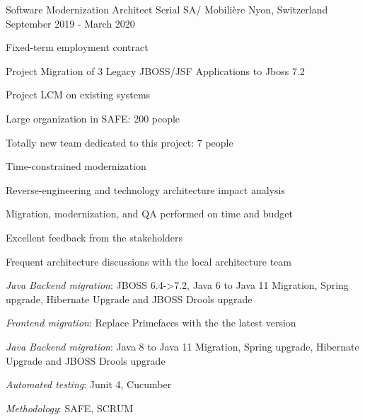 \begin{cventries}
    \cventry
    {Software Modernization Architect} %
    {Serial SA/ Mobilière} %
    {Nyon, Switzerland} %
    {September 2019 - March 2020} %
    {
        \experience
        {
            \begin{cvitems} %
                \item{Fixed-term employment contract}
                \item{Project Migration of 3 Legacy JBOSS/JSF Applications to Jboss 7.2}
                \item{Project LCM on existing systems}
                \item{Large organization in SAFE: 200 people}
                \item{Totally new team dedicated to this project: 7 people}
                \item{Time-constrained modernization}
                \item{Reverse-engineering and technology architecture impact analysis}
            \end{cvitems}
        }
        {
            \begin{cvitems} %
                \item{Migration, modernization, and QA performed on time and budget}
                \item{Excellent feedback from the stakeholders}
                \item{Frequent architecture discussions with the local architecture team}
            \end{cvitems}
        }
        {
            \begin{cvitems} %
                \item{\emph{Java Backend migration}: JBOSS 6.4->7.2, Java 6 to Java 11 Migration, Spring upgrade, Hibernate Upgrade and JBOSS Drools upgrade}
                \item{\emph{Frontend migration}: Replace Primefaces with the the latest version}
                \item{\emph{Java Backend migration}: Java 8 to Java 11 Migration, Spring upgrade, Hibernate Upgrade and JBOSS Drools upgrade}
                \item{\emph{Automated testing}: Junit 4, Cucumber}
                \item{\emph{Methodology}: SAFE, SCRUM}
            \end{cvitems}
        }
    }


\end{cventries}
